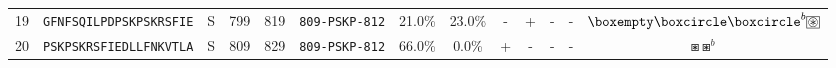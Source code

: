 \begin{tabular}{rcccccccccccc}
19 &  \texttt{GFNFSQILPDPSKPSKRSFIE} &       S &    799 &   819 &                \texttt{{\scriptsize 809-}PSKP{\scriptsize -812}} &                          21.0\% &                           23.0\% &          - &           + &          - &           - &                                              $ \boxempty \boxcircle \boxcircle^b \setlength{\fboxsep}{0.5pt} \boxed{\circledast} $ \\
20 &  \texttt{PSKPSKRSFIEDLLFNKVTLA} &       S &    809 &   829 &                \texttt{{\scriptsize 809-}PSKP{\scriptsize -812}} &                          66.0\% &                            0.0\% &          + &           - &          - &           - &                                                                                                              $ \boxast \boxast^b $ \\
\bottomrule
\end{tabular}
